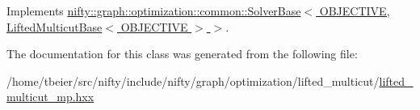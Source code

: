Implements \hyperlink{classnifty_1_1graph_1_1optimization_1_1common_1_1SolverBase_a1c08eb1ff2b3cca5366c3aab161ba040}{nifty\+::graph\+::optimization\+::common\+::\+Solver\+Base$<$ O\+B\+J\+E\+C\+T\+I\+V\+E, Lifted\+Multicut\+Base$<$ O\+B\+J\+E\+C\+T\+I\+V\+E $>$ $>$}.



The documentation for this class was generated from the following file\+:\begin{DoxyCompactItemize}
\item 
/home/tbeier/src/nifty/include/nifty/graph/optimization/lifted\+\_\+multicut/\hyperlink{lifted__multicut__mp_8hxx}{lifted\+\_\+multicut\+\_\+mp.\+hxx}\end{DoxyCompactItemize}
